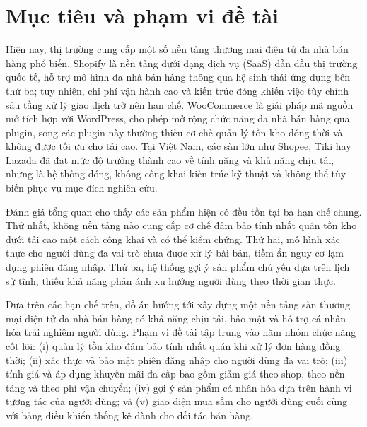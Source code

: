 \documentclass[../DoAn.tex]{subfiles}
\begin{document}
\section{Mục tiêu và phạm vi đề tài}
\label{section:1.2}
Hiện nay, thị trường cung cấp một số nền tảng thương mại điện tử đa nhà bán hàng phổ biến. Shopify là nền tảng dưới dạng dịch vụ (SaaS) dẫn đầu thị trường quốc tế, hỗ trợ mô hình đa nhà bán hàng thông qua hệ sinh thái ứng dụng bên thứ ba; tuy nhiên, chi phí vận hành cao và kiến trúc đóng khiến việc tùy chỉnh sâu tầng xử lý giao dịch trở nên hạn chế. WooCommerce là giải pháp mã nguồn mở tích hợp với WordPress, cho phép mở rộng chức năng đa nhà bán hàng qua plugin, song các plugin này thường thiếu cơ chế quản lý tồn kho đồng thời và không được tối ưu cho tải cao. Tại Việt Nam, các sàn lớn như Shopee, Tiki hay Lazada đã đạt mức độ trưởng thành cao về tính năng và khả năng chịu tải, nhưng là hệ thống đóng, không công khai kiến trúc kỹ thuật và không thể tùy biến phục vụ mục đích nghiên cứu.

Đánh giá tổng quan cho thấy các sản phẩm hiện có đều tồn tại ba hạn chế chung. Thứ nhất, không nền tảng nào cung cấp cơ chế đảm bảo tính nhất quán tồn kho dưới tải cao một cách công khai và có thể kiểm chứng. Thứ hai, mô hình xác thực cho người dùng đa vai trò chưa được xử lý bài bản, tiềm ẩn nguy cơ lạm dụng phiên đăng nhập. Thứ ba, hệ thống gợi ý sản phẩm chủ yếu dựa trên lịch sử tĩnh, thiếu khả năng phản ánh xu hướng người dùng theo thời gian thực.

Dựa trên các hạn chế trên, đồ án hướng tới xây dựng một nền tảng sàn thương mại điện tử đa nhà bán hàng có khả năng chịu tải, bảo mật và hỗ trợ cá nhân hóa trải nghiệm người dùng. Phạm vi đề tài tập trung vào năm nhóm chức năng cốt lõi: (i) quản lý tồn kho đảm bảo tính nhất quán khi xử lý đơn hàng đồng thời; (ii) xác thực và bảo mật phiên đăng nhập cho người dùng đa vai trò; (iii) tính giá và áp dụng khuyến mãi đa cấp bao gồm giảm giá theo shop, theo nền tảng và theo phí vận chuyển; (iv) gợi ý sản phẩm cá nhân hóa dựa trên hành vi tương tác của người dùng; và (v) giao diện mua sắm cho người dùng cuối cùng với bảng điều khiển thống kê dành cho đối tác bán hàng.
\end{document}

